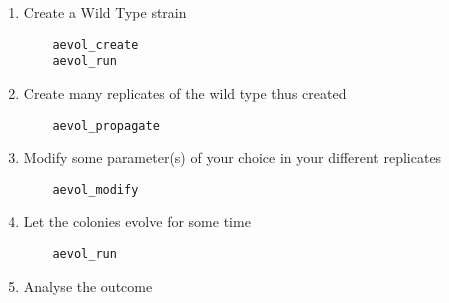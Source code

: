\begin{enumerate}
\item Create a Wild Type strain
\begin{verbatim}
	aevol_create
	aevol_run
\end{verbatim}

\item Create many replicates of the wild type thus created
\begin{verbatim}
	aevol_propagate
\end{verbatim}

\item Modify some parameter(s) of your choice in your different replicates
\begin{verbatim}
	aevol_modify
\end{verbatim}

\item Let the colonies evolve for some time
\begin{verbatim}
	aevol_run
\end{verbatim}

\item Analyse the outcome
\end{enumerate}


\clearemptydoublepage






